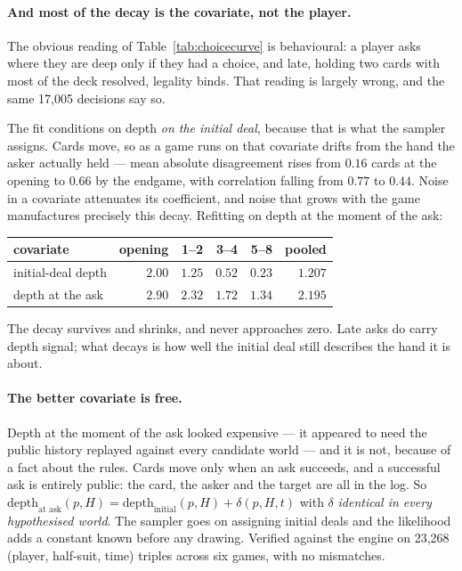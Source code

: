 \documentclass[11pt,a4paper]{article}
\begin{document}
\paragraph{And most of the decay is the covariate, not the player.} The obvious
reading of Table~\ref{tab:choicecurve} is behavioural: a player asks where they
are deep only if they had a choice, and late, holding two cards with most of the
deck resolved, legality binds. That reading is largely wrong, and the same
17{,}005 decisions say so.

The fit conditions on depth \emph{on the initial deal}, because that is what the
sampler assigns. Cards move, so as a game runs on that covariate drifts from the
hand the asker actually held --- mean absolute disagreement rises from $0.16$
cards at the opening to $0.66$ by the endgame, with correlation falling from
$0.77$ to $0.44$. Noise in a covariate attenuates its coefficient, and noise that
grows with the game manufactures precisely this decay. Refitting on depth at the
moment of the ask:

\begin{center}
\small
\begin{tabular}{lrrrrr}
\toprule
covariate & opening & 1--2 & 3--4 & 5--8 & pooled \\
\midrule
initial-deal depth & $2.00$ & $1.25$ & $0.52$ & $0.23$ & $1.207$ \\
depth at the ask   & $2.90$ & $2.32$ & $1.72$ & $1.34$ & $2.195$ \\
\bottomrule
\end{tabular}
\end{center}

The decay survives and shrinks, and never approaches zero. Late asks do carry
depth signal; what decays is how well the initial deal still describes the hand
it is about.

\paragraph{The better covariate is free.} Depth at the moment of the ask looked
expensive --- it appeared to need the public history replayed against every
candidate world --- and it is not, because of a fact about the rules. Cards move
only when an ask succeeds, and a successful ask is entirely public: the card, the
asker and the target are all in the log. So
$\text{depth}_{\text{at ask}}(p,H) = \text{depth}_{\text{initial}}(p,H) +
\delta(p,H,t)$ with $\delta$ \emph{identical in every hypothesised world}. The
sampler goes on assigning initial deals and the likelihood adds a constant known
before any drawing. Verified against the engine on 23{,}268
(player, half-suit, time) triples across six games, with no mismatches.
\end{document}
